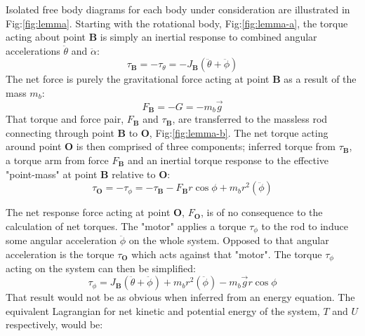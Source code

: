 \par
Isolated free body diagrams for each body under consideration are illustrated in Fig:\ref{fig:lemma}. Starting with the rotational body, Fig:\ref{fig:lemma-a}, the torque acting about point $\mathbf{B}$ is simply an inertial response to combined angular accelerations $\ddot{\theta}$ and $\ddot{\alpha}$:
\begin{equation}
\tau_\mathbf{B}=-\tau_\theta=-J_\mathbf{B}(\ddot{\theta}+\ddot{\phi})
\end{equation}
The net force is purely the gravitational force acting at point $\mathbf{B}$ as a result of the mass $m_b$:
\begin{equation}
F_\mathbf{B}=-G=-m_b\vec{g}
\end{equation}
That torque and force pair, $F_\mathbf{B}$ and $\tau_\mathbf{B}$, are transferred to the massless rod connecting through point $\mathbf{B}$ to $\mathbf{O}$, Fig:\ref{fig:lemma-b}. The net torque acting around point $\mathbf{O}$ is then comprised of three components; inferred torque from $\tau_\mathbf{B}$, a torque arm from force $F_\mathbf{B}$ and an inertial torque response to the effective "point-mass" at point $\mathbf{B}$ relative to $\mathbf{O}$:
\begin{equation}
\tau_\mathbf{O}=-\tau_\phi=-\tau_\mathbf{B}-F_\mathbf{B}r\cos{\phi}+m_br^2(\ddot{\phi})
\end{equation}
\par
The net response force acting at point $\mathbf{O}$, $F_\mathbf{O}$, is of no consequence to the calculation of net torques. The "motor" applies a torque $\tau_\phi$ to the rod to induce some angular acceleration $\ddot{\phi}$ on the whole system. Opposed to that angular acceleration is the torque $\tau_\mathbf{O}$ which acts against that "motor". The torque $\tau_\phi$ acting on the system can then be simplified:
\begin{equation}
\tau_\phi=J_\mathbf{B}(\ddot{\theta}+\ddot{\phi})+m_br^2(\ddot{\phi})-m_b\vec{g}r\cos\phi
\end{equation}
That result would not be as obvious when inferred from an energy equation. The equivalent Lagrangian for net kinetic and potential energy of the system, $T$ and $U$ respectively, would be:
